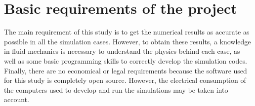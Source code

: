 \section{Basic requirements of the project}
The main requirement of this study is to get the numerical results as accurate as possible in all the simulation cases.
However, to obtain these results, a knowledge in fluid mechanics is necessary to understand the physics behind each case, as well as some basic programming skills to correctly develop the simulation codes.
Finally, there are no economical or legal requirements because the software used for this study is completely open source. However, the electrical consumption of the computers used to develop and run the simulations may be taken into account.